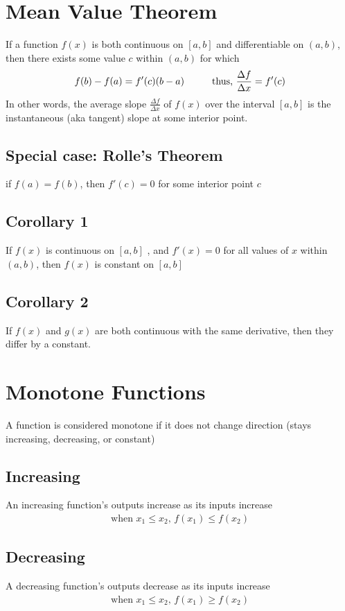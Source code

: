 \documentclass{article}
\newcommand\tab[1][1cm]{\hspace*{#1}}
\newcommand\fx{\(f(x)\) }
\newcommand\ciab{\([a, b]\) }
\begin{document}
\section{Mean Value Theorem}
    If a function \fx is both continuous on \([a, b]\) and differentiable on \((a, b)\), then there exists some value \(c\) within \((a, b)\) for which
    \begin{gather*}
        f(b)-f(a)=f'(c)(b-a) \text{\tab thus, } \frac{\Delta f}{\Delta x} = f'(c)
    \end{gather*}
    In other words, the average slope \(\frac{\Delta f}{\Delta x}\) of \(f(x)\) over the interval \([a, b]\) is the instantaneous (aka tangent) slope at some interior point.
    \subsection{Special case: Rolle's Theorem}
        if \(f(a) = f(b)\), then \(f'(c) = 0\) for some interior point \(c\)
    \subsection{Corollary 1}
    If \fx is continuous on \ciab, and \(f'(x)=0\) for all values of \(x\) within \((a, b)\), then \fx is constant on \ciab
    \subsection{Corollary 2}
    If \fx and \(g(x)\) are both continuous with the same derivative, then they differ by a constant.
\section{Monotone Functions}
    A function is considered monotone if it does not change direction (stays increasing, decreasing, or constant)
    \subsection{Increasing}
        An increasing function's outputs increase as its inputs increase
        \begin{gather*}
            \text{when } x_1 \leq x_2 \text{, } f(x_1) \leq f(x_2)
        \end{gather*}
    \subsection{Decreasing}
        A decreasing function's outputs decrease as its inputs increase
        \begin{gather*}
            \text{when } x_1 \leq x_2 \text{, } f(x_1) \geq f(x_2)
        \end{gather*}
\end{document}
